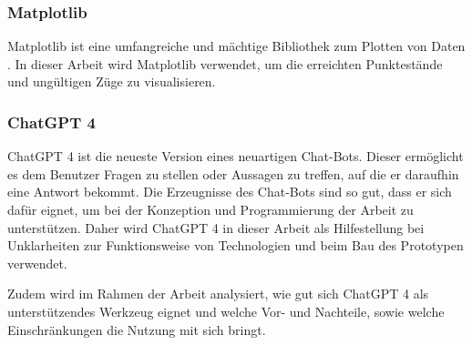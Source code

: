 \subsubsection{Matplotlib}
Matplotlib ist eine umfangreiche und mächtige Bibliothek zum Plotten von Daten \cite{noauthor_matplotlib_nodate}. In dieser Arbeit wird Matplotlib verwendet, um die erreichten Punktestände und ungültigen Züge zu visualisieren.
\subsubsection{ChatGPT 4}
ChatGPT 4 ist die neueste Version eines neuartigen Chat-Bots. Dieser ermöglicht es dem Benutzer Fragen zu stellen oder Aussagen zu treffen, auf die er daraufhin eine Antwort bekommt. Die Erzeugnisse des Chat-Bots sind so gut, dass er sich dafür eignet, um bei der Konzeption und Programmierung der Arbeit zu unterstützen. Daher wird ChatGPT 4 in dieser Arbeit als Hilfestellung bei Unklarheiten zur Funktionsweise von Technologien und beim Bau des Prototypen verwendet. 

Zudem wird im Rahmen der Arbeit analysiert, wie gut sich ChatGPT 4 als unterstützendes Werkzeug eignet und welche Vor- und Nachteile, sowie welche Einschränkungen die Nutzung mit sich bringt.